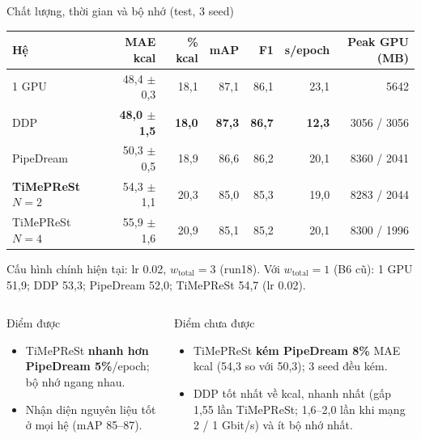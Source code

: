\documentclass[10pt,aspectratio=169]{beamer}
\newcommand{\highlight}[1]{\textcolor{accent}{\bfseries #1}}
\begin{document}
\begin{frame}{Chất lượng, thời gian và bộ nhớ (test, 3 seed)}
\centering
\scriptsize
\setlength{\tabcolsep}{5pt}
\renewcommand{\arraystretch}{1.2}
\begin{tabular}{@{}lrrrrrr@{}}
\toprule
\textbf{Hệ} & \textbf{MAE kcal} & \textbf{\% kcal} & \textbf{mAP} & \textbf{F1} & \textbf{s/epoch} & \textbf{Peak GPU (MB)} \\
\midrule
1 GPU & 48,4 $\pm$ 0,3 & 18,1 & 87,1 & 86,1 & 23,1 & 5642 \\
DDP & \textbf{48,0 $\pm$ 1,5} & \textbf{18,0} & \textbf{87,3} & \textbf{86,7} & \textbf{12,3} & 3056 / 3056 \\
PipeDream & 50,3 $\pm$ 0,5 & 18,9 & 86,6 & 86,2 & 20,1 & 8360 / 2041 \\
\textbf{TiMePReSt $N=2$} & 54,3 $\pm$ 1,1 & 20,3 & 85,0 & 85,3 & 19,0 & 8283 / 2044 \\
TiMePReSt $N=4$ & 55,9 $\pm$ 1,6 & 20,9 & 85,1 & 85,2 & 20,1 & 8300 / 1996 \\
\bottomrule
\end{tabular}

{\tiny Cấu hình chính hiện tại: lr 0.02, $w_\text{total} = 3$ (run18). Với $w_\text{total} = 1$ (B6 cũ): 1 GPU 51,9; DDP 53,3; PipeDream 52,0; TiMePReSt 54,7 (lr 0.02).}
\vspace{0.15cm}
\begin{columns}[T]
\begin{greenbox}{\faThumbsUp\; Điểm được}
\scriptsize
\begin{itemize}
  \item TiMePReSt \highlight{nhanh hơn PipeDream 5\%}/epoch; bộ nhớ ngang nhau.
  \item Nhận diện nguyên liệu tốt ở mọi hệ (mAP 85--87).
\end{itemize}
\end{greenbox}
\begin{accentbox}{\faExclamationTriangle\; Điểm chưa được}
\scriptsize
\begin{itemize}
  \item TiMePReSt \highlight{kém PipeDream 8\%} MAE kcal (54,3 so với 50,3); 3 seed đều kém.
  \item DDP tốt nhất về kcal, nhanh nhất (gấp 1,55 lần TiMePReSt; 1,6--2,0 lần khi mạng 2 / 1 Gbit/s) và ít bộ nhớ nhất.
\end{itemize}
\end{accentbox}
\end{columns}
\end{frame}
\end{document}
